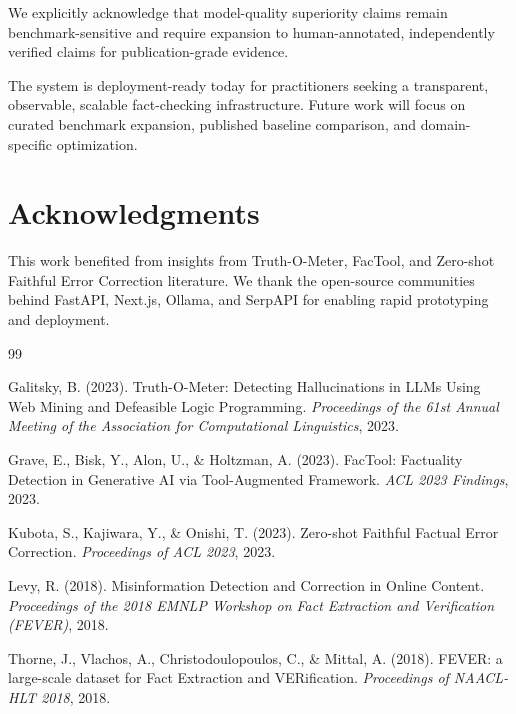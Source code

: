 \documentclass[12pt,a4paper,twoside]{article}
\begin{document}
We explicitly acknowledge that model-quality superiority claims remain benchmark-sensitive and require expansion to human-annotated, independently verified claims for publication-grade evidence.

The system is deployment-ready today for practitioners seeking a transparent, observable, scalable fact-checking infrastructure. Future work will focus on curated benchmark expansion, published baseline comparison, and domain-specific optimization.

\section*{Acknowledgments}

This work benefited from insights from Truth-O-Meter, FacTool, and Zero-shot Faithful Error Correction literature. We thank the open-source communities behind FastAPI, Next.js, Ollama, and SerpAPI for enabling rapid prototyping and deployment.


\begin{thebibliography}{99}

Galitsky, B. (2023).
Truth-O-Meter: Detecting Hallucinations in LLMs Using Web Mining and Defeasible Logic Programming.
\textit{Proceedings of the 61st Annual Meeting of the Association for Computational Linguistics}, 2023.

Grave, E., Bisk, Y., Alon, U., \& Holtzman, A. (2023).
FacTool: Factuality Detection in Generative AI via Tool-Augmented Framework.
\textit{ACL 2023 Findings}, 2023.

Kubota, S., Kajiwara, Y., \& Onishi, T. (2023).
Zero-shot Faithful Factual Error Correction.
\textit{Proceedings of ACL 2023}, 2023.

Levy, R. (2018).
Misinformation Detection and Correction in Online Content.
\textit{Proceedings of the 2018 EMNLP Workshop on Fact Extraction and Verification (FEVER)}, 2018.

Thorne, J., Vlachos, A., Christodoulopoulos, C., \& Mittal, A. (2018).
FEVER: a large-scale dataset for Fact Extraction and VERification.
\textit{Proceedings of NAACL-HLT 2018}, 2018.

\end{thebibliography}
\end{document}
